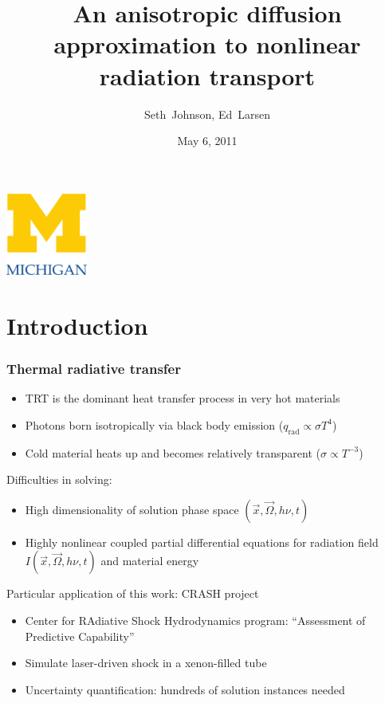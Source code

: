 \documentclass[draft]{beamer}
\title[ORNL Seminar]%
{An anisotropic diffusion approximation to nonlinear radiation transport}
\author[SRJ, EWL]{Seth~Johnson, Ed~Larsen}
\institute[UMich]{
University of Michigan, Ann Arbor
}
\date[5/6/2011]{May 6, 2011}
\begin{document}

\begin{frame}
\titlepage
\begin{center}
  \includegraphics[width=0.2\textwidth]{../figures/umlogo}
\end{center}
\end{frame}

\section{Introduction}
\begin{frame}
  \frametitle{Thermal radiative transfer}
  \begin{itemize}
    \item TRT is the dominant heat transfer process in very hot materials
    \item Photons born isotropically via black body emission
      ($q_\text{rad} \propto \sigma T^4$)
    \item Cold material heats up and becomes relatively transparent
      ($\sigma\propto T^{-3}$)
  \end{itemize}

  Difficulties in solving:
  \begin{itemize}
    \item High dimensionality of solution phase space $(\vec{x}, \vec{\Omega},
      h\nu, t)$
    \item Highly nonlinear coupled partial differential equations for radiation
      field $I(\vec{x}, \vec{\Omega}, h\nu, t)$ and material energy
  \end{itemize}

  Particular application of this work: CRASH project
  \begin{itemize}
    \item Center for RAdiative Shock Hydrodynamics program: ``Assessment
      of Predictive Capability''
    \item Simulate laser-driven shock in a xenon-filled tube
    \item Uncertainty quantification: hundreds of solution instances needed
  \end{itemize}
\end{frame}
\end{document}
